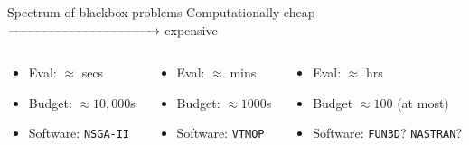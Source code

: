 \documentclass[xcolor=dvipsnames]{beamer}
\begin{document}
\begin{frame}{Spectrum of blackbox problems}
Computationally cheap $\xrightarrow{\hspace*{4cm}}$ expensive
\bigskip
\begin{columns}
\begin{column}{.33\textwidth}
\begin{itemize}
\item Eval: $\approx$ secs
\item Budget: $\approx 10,000$s
\item Software: {\tt NSGA-II}
\end{itemize}
\end{column}
\begin{column}{.33\textwidth}
\begin{itemize}
\item Eval: $\approx$ mins
\item Budget: $\approx 1000$s
\item Software: {\tt VTMOP}
\end{itemize}
\end{column}
\begin{column}{.33\textwidth}
\begin{itemize}
\item Eval: $\approx$ hrs
\item Budget $\approx 100$ (at most)
\item Software: {\tt FUN3D}? {\tt NASTRAN}?
\end{itemize}
\end{column}
\end{columns}
\end{frame}
\end{document}
